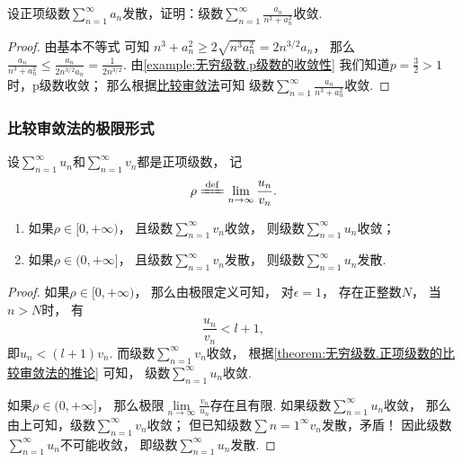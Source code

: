 \begin{example}
设正项级数\(\sum\limits_{n=1}^\infty a_n\)发散，证明：级数\(\sum\limits_{n=1}^\infty \frac{a_n}{n^3+a_n^2}\)收敛.
\begin{proof}
由基本不等式  可知
\(n^3+a_n^2\geq2\sqrt{n^3 a_n^2}=2n^{3/2}a_n\)，
那么\(\frac{a_n}{n^3+a_n^2}\leq\frac{a_n}{2n^{3/2}a_n}=\frac{1}{2n^{3/2}}\).
由\cref{example:无穷级数.p级数的收敛性}
我们知道\(p=\frac{3}{2}>1\)时，p级数收敛；
那么根据\hyperref[theorem:无穷级数.正项级数的比较审敛法]{比较审敛法}可知
级数\(\sum\limits_{n=1}^\infty \frac{a_n}{n^3+a_n^2}\)收敛.
\end{proof}
\end{example}

\subsubsection{比较审敛法的极限形式}
\begin{theorem}[比较审敛法的极限形式]\label{theorem:无穷级数.正项级数的比较审敛法的极限形式}
设\(\sum\limits_{n=1}^\infty u_n\)和\(\sum\limits_{n=1}^\infty v_n\)都是正项级数，
记\[
	\rho
	\defeq
	\lim\limits_{n\to\infty} \frac{u_n}{v_n}.
\]
\begin{enumerate}
	\item 如果\(\rho\in[0,+\infty)\)，
	且级数\(\sum\limits_{n=1}^\infty v_n\)收敛，
	则级数\(\sum\limits_{n=1}^\infty u_n\)收敛；

	\item 如果\(\rho\in(0,+\infty]\)，
	且级数\(\sum\limits_{n=1}^\infty v_n\)发散，
	则级数\(\sum\limits_{n=1}^\infty u_n\)发散.
\end{enumerate}
\begin{proof}
如果\(\rho\in[0,+\infty)\)，
那么由极限定义可知，
对\(\epsilon=1\)，
存在正整数\(N\)，
当\(n>N\)时，
有\[
	\frac{u_n}{v_n} < l+1,
\]
即\(u_n < (l+1) v_n\).
而级数\(\sum\limits_{n=1}^\infty v_n\)收敛，
根据\cref{theorem:无穷级数.正项级数的比较审敛法的推论} 可知，
级数\(\sum\limits_{n=1}^\infty u_n\)收敛.

如果\(\rho\in(0,+\infty]\)，
那么极限\(\lim\limits_{n\to\infty} \frac{v_n}{u_n}\)存在且有限.
如果级数\(\sum\limits_{n=1}^\infty u_n\)收敛，
那么由上可知，级数\(\sum\limits_{n=1}^\infty v_n\)收敛；
但已知级数\(\sum\limits{n=1}^\infty v_n\)发散，矛盾！
因此级数\(\sum\limits_{n=1}^\infty u_n\)不可能收敛，
即级数\(\sum\limits_{n=1}^\infty u_n\)发散.
\end{proof}
\end{theorem}

